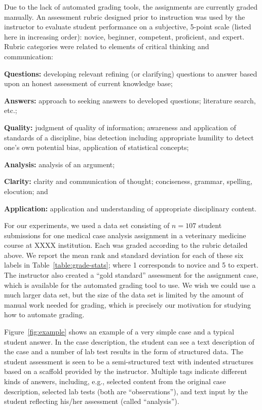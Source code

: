 Due to the lack of automated grading tools, the assignments are currently
graded manually. An assessment rubric designed prior to instruction was
used by the instructor to evaluate student performance on a subjective,
5-point scale (listed here in increasing order): novice, beginner,
competent, proficient, and expert. Rubric categories were related to
elements of critical thinking and communication:
\begin{enumerate*}[label=\itshape(\arabic*)\upshape]
\item {\bf Questions:} developing relevant refining (or clarifying)
 questions to answer based upon an honest assessment of current knowledge
 base;
\item {\bf Answers:} approach to seeking answers to developed
 questions; literature search, etc.;
\item {\bf Quality:} judgment of quality of information; awareness and
 application of standards of a discipline, bias detection including
 appropriate humility to detect one’s own potential bias, application of
 statistical concepts;
\item {\bf Analysis:} analysis of an argument;
\item  {\bf Clarity:} clarity and communication of thought; conciseness,
 grammar, spelling, elocution; and
\item {\bf Application:} application and understanding of appropriate
 disciplinary content.
\end{enumerate*}



For our experiments, we used a data set consisting of $n = 107$ student submissions for one medical case
analysis assignment in a veterinary medicine course at XXXX institution.
Each was graded according to the rubric detailed above.  We report the mean
rank and standard deviation for each of these six labels in
Table~\ref{table:grade-stats}; where 1 corresponds to novice and 5 to
expert. The instructor also created a ``gold standard'' assessment for the
assignment case, which is available for the automated grading tool to use.
We wish we could use a much larger data set, but the size of the data set is limited
by the amount of manual work needed for grading, which is precisely our motivation for
studying how to automate grading.  

Figure~\ref{fig:example} shows an example of a very simple case and a typical
student answer. In the case description, the student can see a text
description of the case and a number of lab test results in the form of
structured data. The student assessment is seen to be a semi-structured
text with indented structures based on a scaffold provided by the
instructor. Multiple tags indicate different kinds of answers, including,
e.g., selected content from the original case description, selected lab
tests (both are ``observations''), and text input by the student reflecting
his/her assessment (called ``analysis'').

